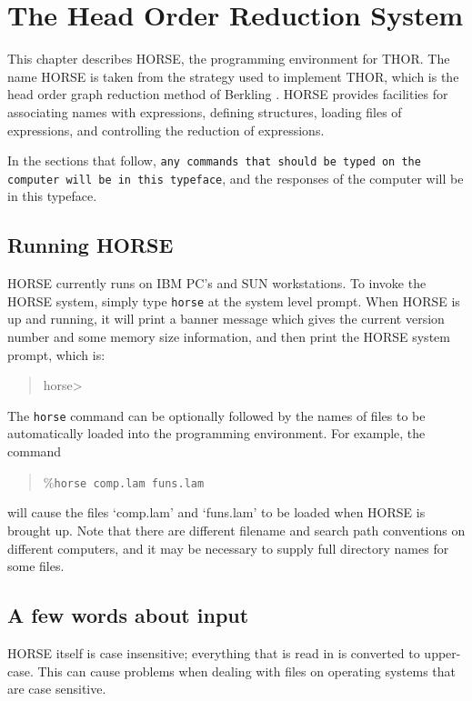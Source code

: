 \chapter{The Head Order Reduction System}
\label{chapter-horse}

	This chapter describes HORSE, the programming environment for THOR.
The name HORSE is taken from the strategy used to implement THOR, which
is the head order graph reduction method of Berkling \cite{berkling}.  
HORSE provides
facilities for associating names with expressions, defining structures,
loading files of expressions, and controlling the reduction of expressions.

	In the sections that follow, {\tt any commands that should be typed on the
computer will be in this typeface}, and {\sc the responses of the computer
will be in this typeface}.


\section{Running HORSE}

	HORSE currently runs on IBM PC's and SUN workstations.  To invoke the
HORSE system, simply type {\tt horse} at the system level prompt.  When
HORSE is up and running, it will print a banner message which gives the
current version number and some memory size information, and then print the
HORSE system prompt, which is:
\begin{quote}
	{\sc horse>}
\end{quote}
The {\tt horse} command can be optionally followed by the names of files to
be automatically loaded into the programming environment.  For example,
the command
\begin{quote}
	{\sc \%}{\tt horse comp.lam funs.lam}
\end{quote}
will cause the files `comp.lam' and `funs.lam' to be loaded when HORSE
is brought up.  Note that there are different filename and search path
conventions on different computers, and it may be necessary to supply
full directory names for some files.


\section{A few words about input}

	HORSE itself is case insensitive;  everything that is read in is
converted to upper-case.  This can cause problems when dealing with files
on operating systems that are case sensitive.

